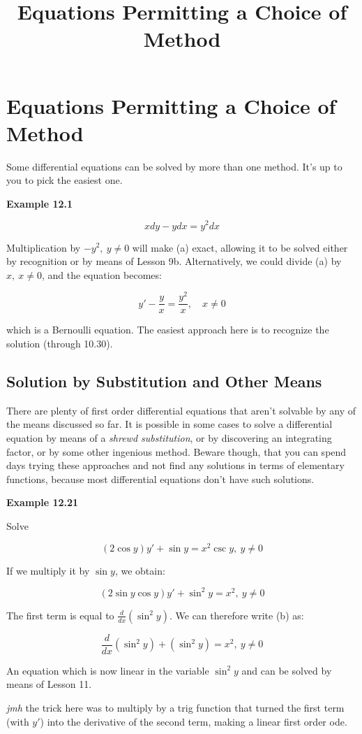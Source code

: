 \documentclass{article}
\title{Equations Permitting a Choice of Method}
\begin{document}
\section{Equations Permitting a Choice of Method}

Some differential equations can be solved by more than one method. It's up to you to pick the easiest one.

\textbf{Example 12.1}

\[ \tag{a} xdy - ydx = y^2dx \]

Multiplication by $-y^2, ~ y \neq 0$ will make (a) exact, allowing it to be solved either by recognition or by means of Lesson 9b. Alternatively, we could divide (a) by $x, ~ x \neq 0$, and the equation becomes:

\[ \tag{b} y' - \frac{y}{x} = \frac{y^2}{x}, \quad x \neq 0 \]

which is a Bernoulli equation. The easiest approach here is to recognize the solution (through 10.30).

\subsection{Solution by Substitution and Other Means}

There are plenty of first order differential equations that aren't solvable by any of the means discussed so far. It is possible in some cases to solve a differential equation by means of a \emph{shrewd substitution}, or by discovering an integrating factor, or by some other ingenious method. Beware though, that you can spend days trying these approaches and not find any solutions in terms of elementary functions, because most differential equations don't have such solutions.

\textbf{Example 12.21}

Solve

\[ \tag{a} (2\cos{y})y' + \sin{y} = x^2 \csc{y},~y \neq 0 \]

If we multiply it by $\sin{y}$, we obtain:

\[ \tag{b} (2\sin{y}\cos{y})y' + \sin^2{y} = x^2,~y \neq 0 \]

The first term is equal to $\frac{d}{dx}(\sin^2{y})$. We can therefore write (b) as:

\[ \tag{c} \frac{d}{dx} (\sin^2{y}) + (\sin^2{y}) = x^2, ~ y \neq 0 \]

An equation which is now linear in the variable $\sin^2{y}$ and can be solved by means of Lesson 11.

\emph{jmh} the trick here was to multiply by a trig function that turned the first term (with $y'$) into the derivative of the second term, making a linear first order ode.
\end{document}
